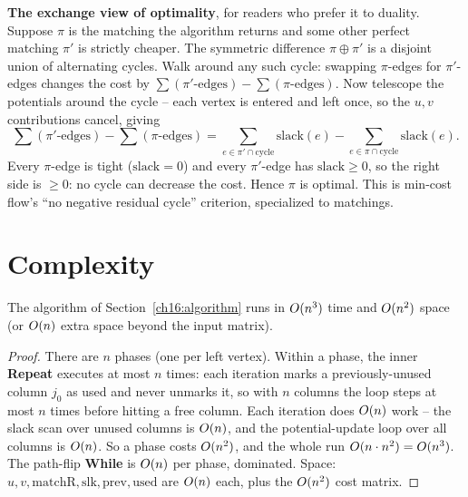 \begin{whybox}
\textbf{The exchange view of optimality}, for readers who prefer it to duality. Suppose $\pi$ is the matching the algorithm returns and some other perfect matching $\pi'$ is strictly cheaper. The symmetric difference $\pi\oplus\pi'$ is a disjoint union of alternating cycles. Walk around any such cycle: swapping $\pi$-edges for $\pi'$-edges changes the cost by $\sum(\pi'\text{-edges}) - \sum(\pi\text{-edges})$. Now telescope the potentials around the cycle -- each vertex is entered and left once, so the $u,v$ contributions cancel, giving
\[
  \sum(\pi'\text{-edges}) - \sum(\pi\text{-edges}) = \sum_{e\in\pi'\cap\text{cycle}} \mathrm{slack}(e) - \sum_{e\in\pi\cap\text{cycle}} \mathrm{slack}(e).
\]
Every $\pi$-edge is tight ($\mathrm{slack}=0$) and every $\pi'$-edge has $\mathrm{slack}\ge0$, so the right side is $\ge0$: no cycle can decrease the cost. Hence $\pi$ is optimal. This is min-cost flow's ``no negative residual cycle'' criterion, specialized to matchings.
\end{whybox}

\section{Complexity}
\label{ch16:complexity}

\begin{theorem}
\label{ch16:thm-time}
The algorithm of Section~\ref{ch16:algorithm} runs in $O(n^3)$ time and $O(n^2)$ space (or $O(n)$ extra space beyond the input matrix).
\end{theorem}

\begin{proof}
There are $n$ phases (one per left vertex). Within a phase, the inner \textbf{Repeat} executes at most $n$ times: each iteration marks a previously-unused column $j_0$ as used and never unmarks it, so with $n$ columns the loop steps at most $n$ times before hitting a free column. Each iteration does $O(n)$ work -- the slack scan over unused columns is $O(n)$, and the potential-update loop over all columns is $O(n)$. So a phase costs $O(n^2)$, and the whole run $O(n\cdot n^2)=O(n^3)$. The path-flip \textbf{While} is $O(n)$ per phase, dominated. Space: $u,v,\mathrm{matchR},\mathrm{slk},\mathrm{prev},\mathrm{used}$ are $O(n)$ each, plus the $O(n^2)$ cost matrix.
\end{proof}

